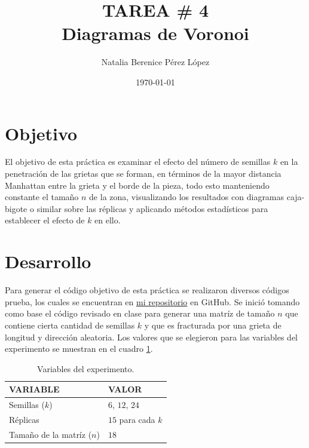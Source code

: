 \documentclass{article}
\title{TAREA \# 4 \\ Diagramas de Voronoi} %
\author{Natalia Berenice P\'{e}rez L\'{o}pez} %
\date{\today}
\begin{document}

\maketitle %

\section{Objetivo}
El objetivo de esta práctica es examinar el efecto del número de semillas $k$ en la penetración de las grietas que se forman, en términos de la mayor distancia Manhattan entre la grieta y el borde de la pieza, todo esto manteniendo constante el tamaño $n$ de la zona, visualizando los resultados con diagramas caja-bigote o similar sobre las réplicas y aplicando métodos estadísticos para establecer el efecto de $k$ en ello.

\section{Desarrollo} %
Para generar el código objetivo de esta práctica se realizaron diversos códigos prueba, los cuales se encuentran en \href{https://github.com/nataliaperez0/Simulation/tree/main/Tarea4}{mi repositorio}  en GitHub. Se inició tomando como base el código revisado en clase \citep{1} para generar una matríz de tamaño $n$ que contiene cierta cantidad de semillas $k$ y que es fracturada por una grieta de longitud y dirección aleatoria. Los valores que se elegieron para las variables del experimento se muestran en el cuadro \ref{Cuadro 1}.

\begin{table}[ht]
\centering
\caption{Variables del experimento.}
\smallskip

 \begin{tabular}{ |p{4cm}|p{3cm}|}
 \hline
 VARIABLE & VALOR \\
 \hline
 Semillas ($k$) & $6$, $12$, $24$ \\
 \hline
 Réplicas    & $15$ para cada $k$ \\
 \hline
 Tamaño de la matríz ($n$) & $18$ \\
 \hline
\end{tabular}
\label{Cuadro 1}
\end{table}
\end{document}
